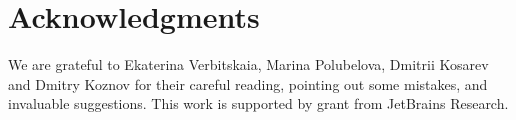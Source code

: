 \section*{Acknowledgments}

We are grateful to Ekaterina Verbitskaia, Marina Polubelova, Dmitrii Kosarev and Dmitry Koznov for their careful reading, pointing out some mistakes, and invaluable suggestions.
This work is supported by grant from JetBrains Research.